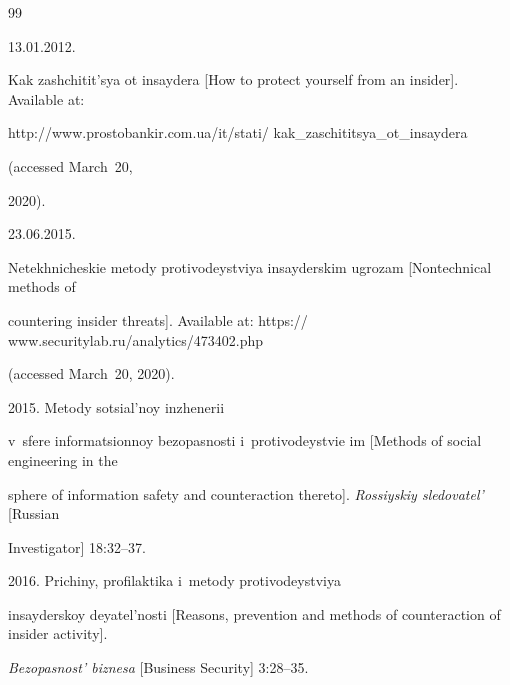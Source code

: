 {\small\frenchspacing


{%




\begin{thebibliography}{99}







 13.01.2012.


Kak zashchitit'sya ot insaydera [How to protect yourself from an insider]. Available at: {\sf 


http://www.prostobankir.com.ua/it/stati/ kak\_zaschititsya\_ot\_insaydera} (accessed March~20, 


2020).




 23.06.2015.


Netekhnicheskie metody protivodeystviya insayderskim ugrozam [Nontechnical methods of 


countering insider threats]. Available at: {\sf https:// www.securitylab.ru/analytics/473402.php} 


(accessed March~20, 2020).










 2015. Metody sotsial'noy inzhenerii 


v~sfere informatsionnoy bezopasnosti i~protivodeystvie im [Methods of social engineering in the 


sphere of information safety and counteraction thereto]. \textit{Rossiyskiy sledovatel'} [Russian 


Investigator] 18:32--37.







 2016. Prichiny, profilaktika i~metody protivodeystviya 


insayderskoy deyatel'nosti [Reasons, prevention and methods of counteraction of insider activity]. 


\textit{Bezopasnost' biznesa} [Business Security] 3:28--35.









\end{thebibliography}}}
